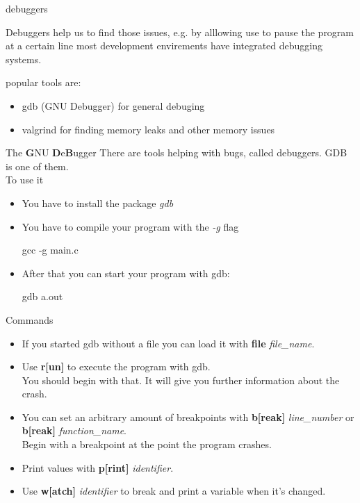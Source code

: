 \documentclass[10pt,graphics,aspectratio=169,table]{beamer}
\begin{document}
\begin{frame}{debuggers}

Debuggers help us to find those issues, e.g. by alllowing use to pause the program at a certain line 
most development envirements have integrated debugging systems.

popular tools are:

\begin{itemize}
    \item gdb (GNU Debugger) for general debuging
    \item valgrind for finding memory leaks and other memory issues
\end{itemize}
\end{frame}
\begin{frame}[fragile]{The \textbf{G}NU \textbf{D}e\textbf{B}ugger}
	There are tools helping with bugs, called debuggers. GDB is one of them.\\
	\bigskip
	To use it
	\begin{itemize}
		\item You have to install the package \textit{gdb}\\
		\item You have to compile your program with the \textit{-g} flag
\begin{code}
gcc -g main.c
\end{code}
		\item After that you can start your program with gdb:
		\begin{code}
gdb a.out
\end{code}
	\end{itemize}
\end{frame}
\begin{frame}{Commands}
	\begin{itemize}
		\item If you started gdb without a file you can load it with \textbf{file} \textit{file\_name}.
		\item Use \textbf{r[un]} to execute the program with gdb.\\
		You should begin with that. It will give you further information about the crash.
		\item You can set an arbitrary amount of breakpoints with \textbf{b[reak]} \textit{line\_number} or \textbf{b[reak]} \textit{function\_name}.\\
		Begin with a breakpoint at the point the program crashes.
		\item Print values with \textbf{p[rint]} \textit{identifier}.
		\item Use \textbf{w[atch]} \textit{identifier} to break and print a variable when it's changed.
	\end{itemize}
\end{frame}
\end{document}
